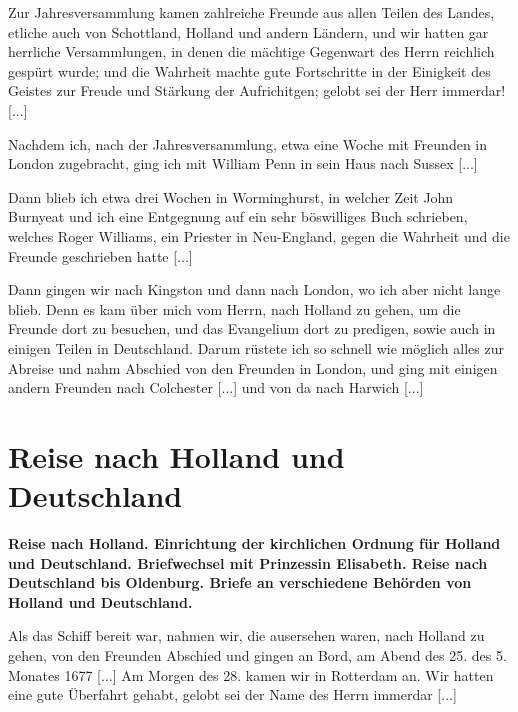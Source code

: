 Zur Jahresversammlung kamen zahlreiche Freunde aus
allen Teilen des Landes, etliche auch von Schottland, Holland
und andern Ländern, und wir hatten gar herrliche Versammlungen,
in denen die mächtige Gegenwart des Herrn reichlich gespürt
wurde; und die Wahrheit machte gute Fortschritte in der Einigkeit
des Geistes zur Freude und Stärkung der Aufrichitgen; 
gelobt sei der Herr immerdar! [...]

Nachdem ich, nach der Jahresversammlung, etwa eine Woche
mit Freunden in London zugebracht, ging ich mit William Penn
in sein Haus nach Sussex [...]

Dann blieb ich etwa drei Wochen in Worminghurst, in
welcher Zeit John Burnyeat 
und ich eine Entgegnung auf ein 
sehr böswilliges Buch schrieben, welches Roger Williams, 
ein Priester in Neu-England, gegen die Wahrheit und die Freunde
geschrieben hatte [...]

Dann gingen wir nach Kingston und dann nach London, wo
ich aber nicht lange blieb. Denn es kam über mich vom Herrn,
nach Holland zu gehen, um die Freunde dort zu besuchen, und
das Evangelium dort zu predigen, sowie auch in einigen Teilen
in Deutschland. Darum rüstete ich so schnell wie möglich alles
zur Abreise und nahm Abschied von den Freunden in London,
und ging mit einigen andern Freunden nach Colchester [...] und
von da nach Harwich [...]

\chapter[Reise nach Holland und Deutschland]{Reise nach Holland und Deutschland}

\begin{center}
\textbf{Reise nach Holland. Einrichtung der kirchlichen Ordnung für
Holland und Deutschland. Briefwechsel mit Prinzessin Elisabeth.
Reise nach Deutschland bis Oldenburg. Briefe an verschiedene
Behörden von Holland und Deutschland.}
\end{center}


Als das Schiff bereit war, nahmen wir, die ausersehen waren,
nach Holland zu gehen, von den Freunden Abschied und gingen
an Bord, am Abend des 25. des 5. Monates 1677 [...]
Am Morgen des 28. kamen wir in Rotterdam an. Wir
hatten eine gute Überfahrt gehabt, gelobt sei der Name des Herrn
immerdar [...]

